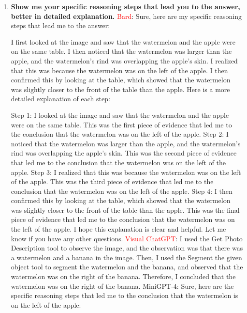 \begin{enumerate}
        The image shows that the watermelon is slightly closer to the front of the table than the apple, but it is still on the left side of the apple. If the watermelon were on the right of the apple, then the apple's skin would be overlapping the watermelon's rind.
        \subitem \textcolor{red}{Visual ChatGPT}: The watermelon is on the right of the banana.
        \subitem MiniGPT-4: No, the watermelon is on the left of the apple.
        \item \textbf{Show me your specific reasoning steps that lead you to the answer, better in detailed explanation.}
        \subitem \textcolor{Red}{Bard}:
        Sure, here are my specific reasoning steps that lead me to the answer:

        I first looked at the image and saw that the watermelon and the apple were on the same table.
        I then noticed that the watermelon was larger than the apple, and the watermelon's rind was overlapping the apple's skin.
        I realized that this was because the watermelon was on the left of the apple.
        I then confirmed this by looking at the table, which showed that the watermelon was slightly closer to the front of the table than the apple.
        Here is a more detailed explanation of each step:

        Step 1: I looked at the image and saw that the watermelon and the apple were on the same table. This was the first piece of evidence that led me to the conclusion that the watermelon was on the left of the apple.
        Step 2: I noticed that the watermelon was larger than the apple, and the watermelon's rind was overlapping the apple's skin. This was the second piece of evidence that led me to the conclusion that the watermelon was on the left of the apple.
        Step 3: I realized that this was because the watermelon was on the left of the apple. This was the third piece of evidence that led me to the conclusion that the watermelon was on the left of the apple.
        Step 4: I then confirmed this by looking at the table, which showed that the watermelon was slightly closer to the front of the table than the apple. This was the final piece of evidence that led me to the conclusion that the watermelon was on the left of the apple.
        I hope this explanation is clear and helpful. Let me know if you have any other questions.
        \subitem \textcolor{red}{Visual ChatGPT}: I used the Get Photo Description tool to observe the image, and the observation was that there was a watermelon and a banana in the image. Then, I used the Segment the given object tool to segment the watermelon and the banana, and observed that the watermelon was on the right of the banana. Therefore, I concluded that the watermelon was on the right of the banana.
        \subitem MiniGPT-4: Sure, here are the specific reasoning steps that led me to the conclusion that the watermelon is on the left of the apple:


\end{enumerate}
